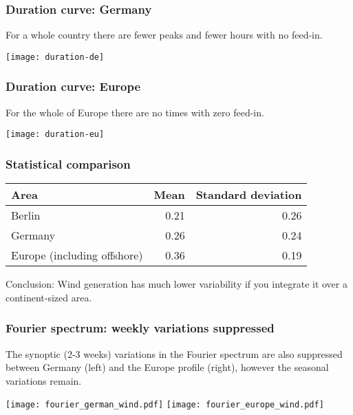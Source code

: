 \documentclass[10pt,aspectratio=169,dvipsnames]{beamer}
\newcommand{\ra}[1]{\renewcommand{\arraystretch}{#1}}
\begin{document}
\begin{frame}
  \frametitle{Duration curve: Germany}

  For a whole country there are fewer peaks and fewer hours with no feed-in.

  \centering
  \texttt{[image: duration-de]}


\end{frame}


\begin{frame}
  \frametitle{Duration curve: Europe}

  For the whole of Europe there are no times with zero feed-in.

  \centering
  \texttt{[image: duration-eu]}


\end{frame}





\begin{frame}
  \frametitle{Statistical comparison}


  \ra{1.1}
  \begin{table}[!t]
    \begin{tabular}{lrr}
      \toprule
      Area & Mean & Standard deviation\\
      \midrule
      Berlin & 0.21 & 0.26 \\
      Germany & 0.26 & 0.24 \\
      Europe (including offshore) & 0.36 & 0.19 \\
      \bottomrule
    \end{tabular}
  \end{table}

  \vspace{1cm}

  \alert{Conclusion}: Wind generation has much lower variability if you integrate it over a continent-sized area.
\end{frame}

\begin{frame}
  \frametitle{Fourier spectrum: weekly variations suppressed}


  The \alert{synoptic} (2-3 weeks) variations in the Fourier spectrum are
  also suppressed between Germany (left) and the Europe
  profile (right), however the seasonal variations remain.

  \vspace{.7cm}
  \texttt{[image: fourier\_german\_wind.pdf]}
  \texttt{[image: fourier\_europe\_wind.pdf]}


\end{frame}
\end{document}
